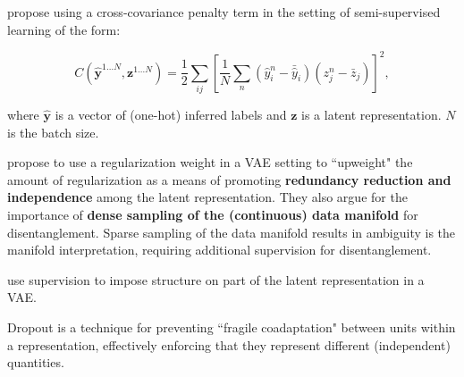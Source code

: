 \cite{cheung2014discovering} propose using a cross-covariance penalty term in the setting of semi-supervised learning of the form:

\begin{equation}
	C(\hat{\mathbf{y}}^{1 \dots N}, \mathbf{z}^{1 \dots N}) = \frac{1}{2} \sum_{ij} \left[ \frac{1}{N} \sum_n (\hat{y}^n_i - \bar{\hat{y}}_i) (z^n_j - \bar{z}_j) \right]^2,
\end{equation}

\noindent where $\hat{\mathbf{y}}$ is a vector of (one-hot) inferred labels and $\mathbf{z}$ is a latent representation. $N$ is the batch size.


\cite{higgins2016early} propose to use a regularization weight in a VAE setting to ``upweight" the amount of regularization as a means of promoting \textbf{redundancy reduction and independence} among the latent representation. They also argue for the importance of \textbf{dense sampling of the (continuous) data manifold} for disentanglement. Sparse sampling of the data manifold results in ambiguity is the manifold interpretation, requiring additional supervision for disentanglement.

\cite{siddharth2016inducing} use supervision to impose structure on part of the latent representation in a VAE.

Dropout \cite{srivastava2014dropout} is a technique for preventing ``fragile coadaptation" between units within a representation, effectively enforcing that they represent different (independent) quantities.